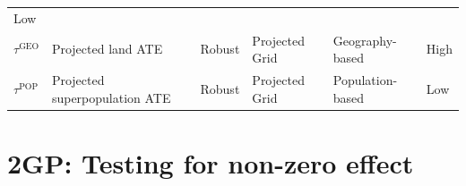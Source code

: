 \documentclass[letter]{article}
\newcommand{\taugeo}{\tau^{\mathrm{GEO}}}
\newcommand{\taupop}{\tau^{\mathrm{POP}}}
\begin{document}
\begin{longtable}[]{@{}llllll@{}}
\begin{minipage}[t]{0.08\columnwidth}
Low\strut
\end{minipage}\tabularnewline
\begin{minipage}[t]{0.09\columnwidth}\raggedright\strut
\(\taugeo\)\strut
\end{minipage} & \begin{minipage}[t]{0.25\columnwidth}\raggedright\strut
Projected land ATE\strut
\end{minipage} & \begin{minipage}[t]{0.13\columnwidth}\raggedright\strut
Robust\strut
\end{minipage} & \begin{minipage}[t]{0.13\columnwidth}\raggedright\strut
Projected Grid\strut
\end{minipage} & \begin{minipage}[t]{0.15\columnwidth}\raggedright\strut
Geography-based\strut
\end{minipage} & \begin{minipage}[t]{0.08\columnwidth}\raggedright\strut
High\strut
\end{minipage}\tabularnewline
\begin{minipage}[t]{0.09\columnwidth}\raggedright\strut
\(\taupop\)\strut
\end{minipage} & \begin{minipage}[t]{0.25\columnwidth}\raggedright\strut
Projected superpopulation ATE\strut
\end{minipage} & \begin{minipage}[t]{0.13\columnwidth}\raggedright\strut
Robust\strut
\end{minipage} & \begin{minipage}[t]{0.13\columnwidth}\raggedright\strut
Projected Grid\strut
\end{minipage} & \begin{minipage}[t]{0.15\columnwidth}\raggedright\strut
Population-based\strut
\end{minipage} & \begin{minipage}[t]{0.08\columnwidth}\raggedright\strut
Low\strut
\end{minipage}\tabularnewline
\bottomrule
\end{longtable}
    


    	\section{2GP: Testing for non-zero effect}\label{gp-testing-for-non-zero-effect}
\end{document}
